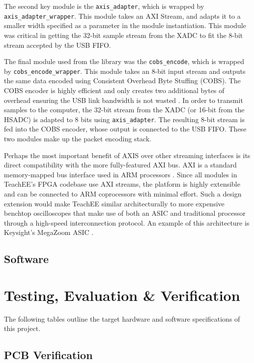 \documentclass[letterpaper,11pt]{article}
\newcommand{\code}[1]{\texttt{#1}}
\begin{document}
The second key module is the \code{axis_adapter}, which is wrapped by
\code{axis_adapter_wrapper}. This module takes an AXI Stream, and adapts it to a
smaller width specified as a parameter in the module instantiation. This module
was critical in getting the 32-bit sample stream from the XADC to fit the 8-bit
stream accepted by the USB FIFO.

The final module used from the library was the \code{cobs_encode}, which is
wrapped by \code{cobs_encode_wrapper}. This module takes an 8-bit input stream
and outputs the same data encoded using Consistent Overhead Byte Stuffing
(COBS). The COBS encoder is highly efficient and only creates two additional
bytes of overhead ensuring the USB link bandwidth is not wasted \cite{cobs}.
In order to transmit samples to the computer, the 32-bit stream from the XADC
(or 16-bit from the HSADC) is adapted to 8 bits using \code{axis_adapter}. The
resulting 8-bit stream is fed into the COBS encoder, whose output is connected
to the USB FIFO. These two modules make up the packet encoding stack.

Perhaps the most important benefit of AXIS over other streaming interfaces is
its direct compatibility with the more fully-featured AXI bus. AXI is a standard
memory-mapped bus interface used in ARM processors \cite{axi_spec}. Since all
modules in TeachEE's FPGA codebase use AXI streams, the platform is highly
extensible and can be connected to ARM coprocessors with minimal effort. Such a
design extension would make TeachEE similar architecturally to more expensive
benchtop oscilloscopes that make use of both an ASIC and traditional processor
through a high-speed interconnection protocol. An example of this architecture
is Keysight's MegaZoom ASIC \cite{keysight_megazoom}.

\subsection{Software} %

\section{Testing, Evaluation \& Verification} \label{sec:testing}
The following tables outline the target hardware and software specifications of
this project.
\subsection{PCB Verification} %
\end{document}
